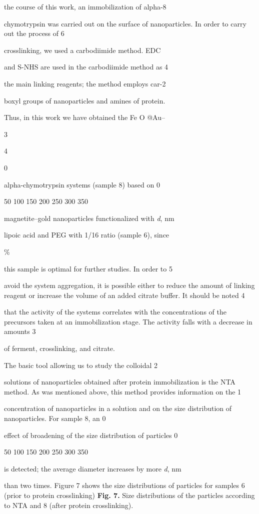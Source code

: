 \documentclass[12pt,a4paper]{article}
\begin{document}
the course of this work, an immobilization of alpha-8

chymotrypsin was carried out on the surface of nanoparticles. In order
to carry out the process of 6

crosslinking, we used a carbodiimide method. EDC

and S-NHS are used in the carbodiimide method as 4

the main linking reagents; the method employs car-2

boxyl groups of nanoparticles and amines of protein.

Thus, in this work we have obtained the Fe O @Au--

3

4

0

alpha-chymotrypsin systems (sample 8) based on 0

50 100 150 200 250 300 350

magnetite--gold nanoparticles functionalized with \emph{d}, nm

lipoic acid and PEG with 1/16 ratio (sample 6), since

\%

this sample is optimal for further studies. In order to 5

avoid the system aggregation, it is possible either to reduce the amount
of linking reagent or increase the volume of an added citrate buffer. It
should be noted 4

that the activity of the systems correlates with the concentrations of
the precursors taken at an immobilization stage. The activity falls with
a decrease in amounts 3

of ferment, crosslinking, and citrate.

The basic tool allowing us to study the colloidal 2

solutions of nanoparticles obtained after protein immobilization is the
NTA method. As was mentioned above, this method provides information on
the 1

concentration of nanoparticles in a solution and on the size
distribution of nanoparticles. For sample 8, an 0

effect of broadening of the size distribution of particles 0

50 100 150 200 250 300 350

is detected; the average diameter increases by more \emph{d}, nm

than two times. Figure 7 shows the size distributions of particles for
samples 6 (prior to protein crosslinking) \textbf{Fig. 7.} Size
distributions of the particles according to NTA and 8 (after protein
crosslinking).
\end{document}
